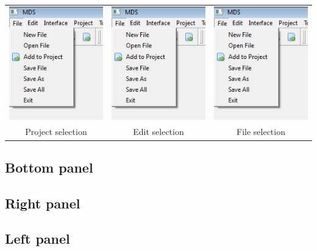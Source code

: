     \begin{table}[h!]
        \begin{tabular}{ccc}
            \includegraphics[width=.25\textwidth]{img/menu_file.png}
                &
            \includegraphics[width=.25\textwidth]{img/menu_file.png}
                &
            \includegraphics[width=.25\textwidth]{img/menu_file.png}
                \\
            Project selection & Edit selection & File selection
        \end{tabular}
    \end{table}

\subsection{Bottom panel}

\subsection{Right panel}

\subsection{Left panel}

